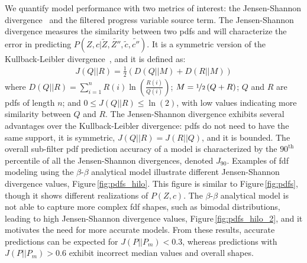 \documentclass[review]{elsarticle}
\newcommand{\wt}[1]{\widetilde{#1}}
\begin{document}
We quantify model performance with two metrics of interest: the
Jensen-Shannon divergence~\cite{Endres2003, Osterreicher2003} and the
filtered progress variable source term. The Jensen-Shannon divergence
measures the similarity between two \glspl{pdf} and will characterize
the error in predicting $P(Z,c | \wt{Z}, \wt{Z''}, \wt{c},
\wt{c''})$. It is a symmetric version of the Kullback-Leibler
divergence~\cite{Kullback1987}, and it is defined as:
\begin{align}
  \label{eq:jsd}
  J(Q||R) = \frac{1}{2} \left( D(Q || M) + D(R || M)\right)
\end{align}
where
$D(Q||R) = \sum_{i=1}^n R(i) \ln{\left( \frac{R(i)}{Q(i)} \right)}$;
$M = \nicefrac{1}{2} \left( Q+R \right)$; $Q$ and $R$ are \glspl{pdf}
of length $n$; and $0\leq J(Q||R) \leq \ln{(2)}$, with low values
indicating more similarity between $Q$ and $R$. The Jensen-Shannon
divergence exhibits several advantages over the Kullback-Leibler
divergence: \glspl{pdf} do not need to have the same support, it is
symmetric, $J(Q||R) = J(R||Q)$, and it is bounded. The overall
sub-filter \gls{pdf} prediction accuracy of a model is characterized
by the $90^{\text{th}}$ percentile of all the Jensen-Shannon
divergences, denoted $J_{90}$. Examples of \gls{fdf}
modeling using the $\beta$-$\beta$ analytical model illustrate
different Jensen-Shannon divergence values,
Figure\,\ref{fig:pdfs_hilo}. This figure is similar to
Figure\,\ref{fig:pdfs}, though it shows different realizations of
$P(Z,c)$. The $\beta$-$\beta$ analytical model is not able to capture
more complex \gls{fdf} shapes, such as bimodal
distributions, leading to high Jensen-Shannon divergence values,
Figure\,\ref{fig:pdfs_hilo_2}, and it motivates the need for more
accurate models.  From these results, accurate predictions can be
expected for $J(P||P_m) < 0.3$, whereas predictions with
$J(P||P_m) > 0.6$ exhibit incorrect median values and overall shapes.
\end{document}
